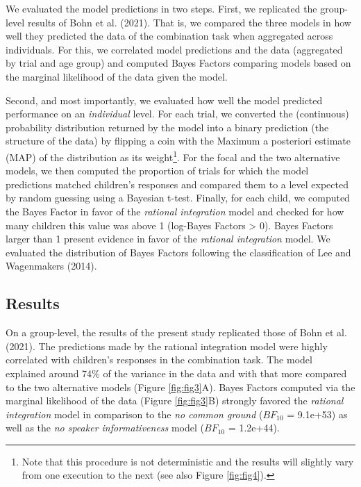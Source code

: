 \documentclass[
  man,floatsintext]{apa6}
\begin{document}
We evaluated the model predictions in two steps. First, we replicated the group-level results of Bohn et al. (2021). That is, we compared the three models in how well they predicted the data of the combination task when aggregated across individuals. For this, we correlated model predictions and the data (aggregated by trial and age group) and computed Bayes Factors comparing models based on the marginal likelihood of the data given the model.

Second, and most importantly, we evaluated how well the model predicted performance on an \emph{individual} level. For each trial, we converted the (continuous) probability distribution returned by the model into a binary prediction (the structure of the data) by flipping a coin with the Maximum a posteriori estimate (MAP) of the distribution as its weight\footnote{Note that this procedure is not deterministic and the results will slightly vary from one execution to the next (see also Figure \ref{fig:fig4}).}. For the focal and the two alternative models, we then computed the proportion of trials for which the model predictions matched children's responses and compared them to a level expected by random guessing using a Bayesian t-test. Finally, for each child, we computed the Bayes Factor in favor of the \emph{rational integration} model and checked for how many children this value was above 1 (log-Bayes Factors \textgreater{} 0). Bayes Factors larger than 1 present evidence in favor of the \emph{rational integration} model. We evaluated the distribution of Bayes Factors following the classification of Lee and Wagenmakers (2014).

\hypertarget{results-1}{%
\subsection{Results}\label{results-1}}

On a group-level, the results of the present study replicated those of Bohn et al. (2021). The predictions made by the rational integration model were highly correlated with children's responses in the combination task. The model explained around 74\% of the variance in the data and with that more compared to the two alternative models (Figure \ref{fig:fig3}A). Bayes Factors computed via the marginal likelihood of the data (Figure \ref{fig:fig3}B) strongly favored the \emph{rational integration} model in comparison to the \emph{no common ground} (\(BF_{10}\) = 9.1e+53) as well as the \emph{no speaker informativeness} model (\(BF_{10}\) = 1.2e+44).
\end{document}
